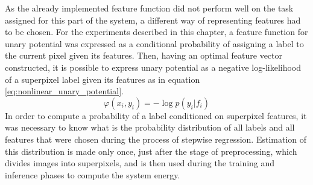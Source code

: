 As the already implemented feature function did not perform well on the task assigned for this part of the system, a different way of representing features had to be chosen. For the experiments described in this chapter, a feature function for unary potential was expressed as a conditional probability of assigning a label to the current pixel given its features. Then, having an optimal feature vector constructed, it is possible to express unary potential as a negative log-likelihood of a superpixel label given its features as in equation \ref{eq:nonlinear_unary_potential}. 
\begin{equation}
    \label{eq:nonlinear_unary_potential}
    \varphi(x_i,y_i) = -\log p(y_i|f_i)
\end{equation}
In order to compute a probability of a label conditioned on superpixel features, it was necessary to know what is the probability distribution of all labels and all features that were chosen during the process of stepwise regression. Estimation of this distribution is made only once, just after the stage of preprocessing, which divides images into superpixels, and is then used during the training and inference phases to compute the system energy. 